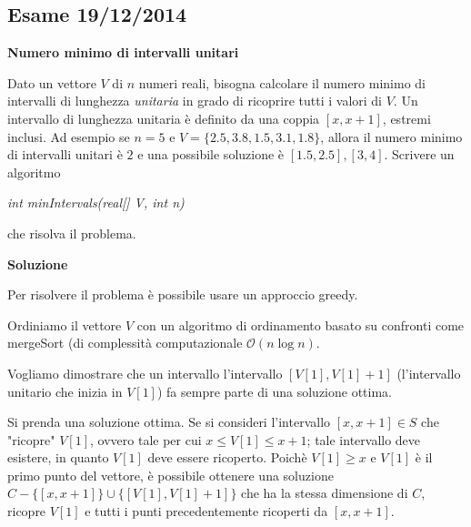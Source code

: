 \documentclass[../cheatSheetAlgoritmi.tex]{subfiles}
\begin{document}
\subsection{Esame 19/12/2014}
\textbf{Numero minimo di intervalli unitari} 

Dato un vettore $V$ di $n$ numeri reali, bisogna calcolare il numero minimo di intervalli di lunghezza \emph{unitaria} in grado di ricoprire tutti i valori di $V$.  Un intervallo di lunghezza unitaria è definito da una coppia $[x, x + 1]$, estremi inclusi. Ad esempio se $n= 5$ e $V=\{2.5,3.8,1.5,3.1,1.8\}$, allora il numero minimo di intervalli unitari è $2$ e una possibile soluzione è $[1.5,2.5] ,[3,4]$. Scrivere un algoritmo 
\begin{center}
	\emph{int minIntervals(real[] V, int n)}
\end{center}
che risolva il problema. 

\textbf{Soluzione} 

Per risolvere il problema è possibile usare un approccio greedy. 

Ordiniamo il vettore $V$ con un algoritmo di ordinamento basato su confronti come mergeSort (di complessità computazionale $\mathcal{O}(n \log n)$. 

Vogliamo dimostrare che un intervallo l'intervallo $[V[1], V[1] + 1]$ (l'intervallo unitario che inizia in $V[1]$) fa sempre parte di una soluzione ottima.  

Si prenda una soluzione ottima. Se si consideri l'intervallo $[x, x + 1] \in S$ che "ricopre" $V[1]$, ovvero tale per cui $x \leq V[1] \leq x + 1$; tale intervallo deve esistere, in quanto $V[1]$ deve essere ricoperto. Poichè $V[1] \geq x$ e $V[1]$ è il primo punto del vettore, è possibile ottenere una soluzione $C - \{[x, x + 1]\} \cup \{[V[1], V[1] + 1]\}$ che ha la stessa dimensione di $C$, ricopre $V[1]$ e tutti i punti precedentemente ricoperti da $[x, x + 1]$. 
\end{document}
